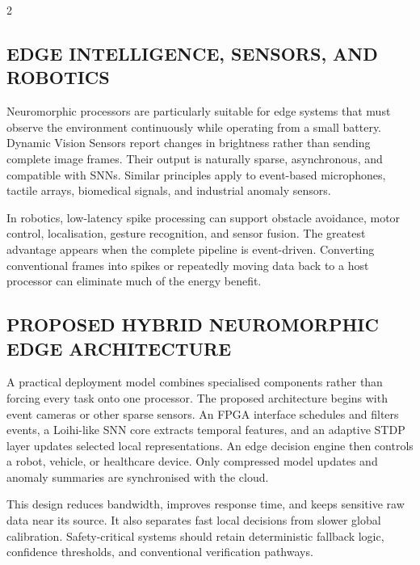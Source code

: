 \begin{multicols}{2}
  \subsection*{\centering\uppercase{Edge Intelligence, Sensors, and Robotics}}
  Neuromorphic processors are particularly suitable for edge systems that must observe the environment continuously while operating from a small battery. Dynamic Vision Sensors report changes in brightness rather than sending complete image frames. Their output is naturally sparse, asynchronous, and compatible with SNNs. Similar principles apply to event-based microphones, tactile arrays, biomedical signals, and industrial anomaly sensors.

  \noindent
  In robotics, low-latency spike processing can support obstacle avoidance, motor control, localisation, gesture recognition, and sensor fusion. The greatest advantage appears when the complete pipeline is event-driven. Converting conventional frames into spikes or repeatedly moving data back to a host processor can eliminate much of the energy benefit.

  \subsection*{\centering\uppercase{Proposed Hybrid Neuromorphic Edge Architecture}}
  A practical deployment model combines specialised components rather than forcing every task onto one processor. The proposed architecture begins with event cameras or other sparse sensors. An FPGA interface schedules and filters events, a Loihi-like SNN core extracts temporal features, and an adaptive STDP layer updates selected local representations. An edge decision engine then controls a robot, vehicle, or healthcare device. Only compressed model updates and anomaly summaries are synchronised with the cloud.

  \begin{center}
\begin{minipage}{0.98\columnwidth}
\centering
    \arjunEdgeFigure
\end{minipage}
  \end{center}

  This design reduces bandwidth, improves response time, and keeps sensitive raw data near its source. It also separates fast local decisions from slower global calibration. Safety-critical systems should retain deterministic fallback logic, confidence thresholds, and conventional verification pathways.


\end{multicols}
